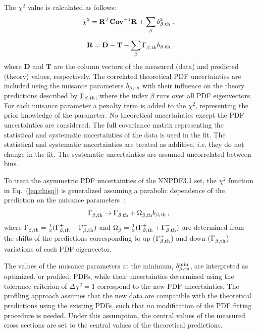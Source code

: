 \documentclass[pdftex,twocolumn,epjc3]{svjour3}          %
\newcommand{\nnpdf} {NNPDF3.1\xspace}
\newcommand{\chisq}{\ensuremath{\chi^2}\xspace}
\begin{document}
The \chisq value is calculated as follows:
\begin{equation}
\begin{split}
  \chisq = \mathbf{R}^{T}_{} \mathbf{Cov}^{-1}_{} \mathbf{R}_{} + \sum_{\beta} b_{\beta,\rm th}^2 \ , \\[5pt]
  \mathbf{R} = \mathbf{D} - \mathbf{T} - \sum_{\beta} \Gamma^{}_{\beta,\rm th} b_{\beta,\rm th} \ ,
\label{eq:chisq}
\end{split}
\end{equation}
%
where $\mathbf{D}$ and $\mathbf{T}$ are the column vectors of the
measured (data) and predicted (theory) values, respectively.  The
correlated theoretical PDF uncertainties are included using the
nuisance parameters $b_{\beta, \rm th}$ with their influence on the
theory predictions described by $\Gamma_{\beta,\rm th}$, where the
index $\beta$ runs over all PDF eigenvectors. For each nuisance
parameter a penalty term is added to the \chisq, representing the
prior knowledge of the parameter. No theoretical uncertainties except
the PDF uncertainties are considered. The full covariance matrix
representing the statistical and systematic uncertainties of the data
is used in the fit. The statistical and systematic uncertainties are
treated as additive, \textit{i.e.} they do not change in the fit. The
systematic uncertainties are assumed uncorrelated between bins.

To treat the asymmetric PDF uncertainties of the \nnpdf set, the
\chisq function in Eq.~(\ref{eq:chisq}) is generalized assuming a
parabolic dependence of the prediction on the nuisance
parameters~\cite{Alekhin:2014irh}:
\begin{eqnarray}
\Gamma^{}_{\beta, \rm th} \to \Gamma^{}_{\beta, \rm th} +  \Omega^{}_{\beta, \rm th}b_{\beta, \rm th}\,, \label{eq:iter}
\end{eqnarray}
where
$\Gamma^{}_{\beta, \rm th} = \frac12(\Gamma^{+}_{\beta, \rm th} -
\Gamma^{-}_{\beta, \rm th})$
and
$\Omega^{}_{\beta} = \frac12 (\Gamma^{+}_{\beta, \rm th} +
\Gamma^{-}_{\beta, \rm th})$
are determined from the shifts of the predictions corresponding to up
($\Gamma^{+}_{\beta, \rm th}$) and down
($ \Gamma^{-}_{\beta, \rm th}$) variations of each PDF eigenvector.

The values of the nuisance parameters at the minimum,
$b^{\rm min}_{\beta,\rm th}$, are interpreted as optimized, or
profiled, PDFs, while their uncertainties determined using the
tolerance criterion of $\Delta\chi^2 = 1$ correspond to the new PDF
uncertainties. The profiling approach assumes that the new data are
compatible with the theoretical predictions using the existing PDFs,
such that no modification of the PDF fitting procedure is
needed. Under this assumption, the central values of the measured
cross sections are set to the central values of the theoretical
predictions.
\end{document}
